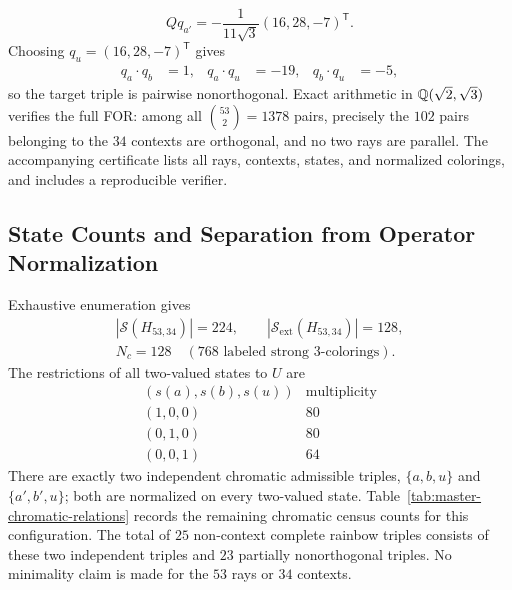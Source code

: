 \documentclass[aps,pra,reprint,superscriptaddress,longbibliography,nofootinbib,floatfix,10pt]{revtex4-2}
\theoremstyle{definition}\newtheorem{definition}[theorem]{Definition}
\theoremstyle{remark}\newtheorem{remark}[theorem]{Remark}
\newcommand{\Sc}{\mathcal S}\newcommand{\Cc}{\mathcal C}\newcommand{\Wc}{\mathcal W}
\begin{document}
\begin{equation}\label{eq:H53-u-ray}
Qq_{a'}=-\frac1{11\sqrt3}(16,28,-7)^{\mathsf T}.
\end{equation}
Choosing $q_u=(16,28,-7)^{\mathsf T}$ gives
\begin{equation}\label{eq:H53-target-products}
\begin{aligned}
q_a\cdot q_b&=1,&q_a\cdot q_u&=-19,&q_b\cdot q_u&=-5,
\end{aligned}
\end{equation}
so the target triple is pairwise nonorthogonal. Exact arithmetic in $\mathbb Q(\sqrt2,\sqrt3)$ verifies the full FOR: among all $\binom{53}{2}=1378$ pairs, precisely the $102$ pairs belonging to the $34$ contexts are orthogonal, and no two rays are parallel. The accompanying certificate lists all rays, contexts, states, and normalized colorings, and includes a reproducible verifier.

\subsection{State Counts and Separation from Operator Normalization}

Exhaustive enumeration gives
\begin{equation}\label{eq:H53-counts}
\begin{gathered}
|\Sc(H_{53,34})|=224,\qquad|\Sc_{\mathrm{ext}}(H_{53,34})|=128,\\
N_c=128\quad(768\text{ labeled strong }3\text{-colorings}).
\end{gathered}
\end{equation}
The restrictions of all two-valued states to $U$ are
\begin{equation}\label{eq:H53-patterns}
\begin{array}{c|r}
(s(a),s(b),s(u))&\text{multiplicity}\\\hline
(1,0,0)&80\\
(0,1,0)&80\\
(0,0,1)&64
\end{array}
\end{equation}
There are exactly two independent chromatic admissible triples, $\{a,b,u\}$ and $\{a',b',u\}$; both are normalized on every two-valued state. Table~\ref{tab:master-chromatic-relations} records the remaining chromatic census counts for this configuration. The total of $25$ non-context complete rainbow triples consists of these two independent triples and $23$ partially nonorthogonal triples. No minimality claim is made for the $53$ rays or $34$ contexts.
\end{document}
